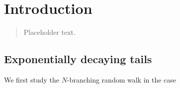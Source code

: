\section{Introduction}\label{dec:introduction}

\begin{quote}
{\small Placeholder text. }
\end{quote}

\subsection{Exponentially decaying tails}
We first study the $N$-branching random walk in the case

